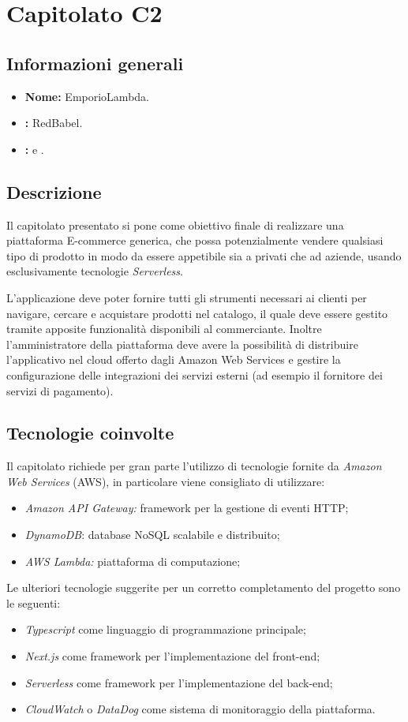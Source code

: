 \section{Capitolato C2}

\subsection{Informazioni generali}{
\begin{itemize}
\item \textbf{Nome:} EmporioLambda.
\item \textbf{\commitProg:} RedBabel.
\item \textbf{\proponProg:} \VT{} e \CR.
\end{itemize}
}

\subsection{Descrizione}{
Il capitolato presentato si pone come obiettivo finale di realizzare una piattaforma E-commerce generica, che possa potenzialmente vendere qualsiasi tipo di prodotto in modo da essere appetibile sia a privati che ad aziende, usando esclusivamente tecnologie \textit{Serverless}.

L'applicazione deve poter fornire tutti gli strumenti necessari ai clienti per navigare, cercare e acquistare prodotti nel catalogo, il quale deve essere gestito tramite apposite funzionalità disponibili al commerciante. Inoltre l'amministratore della piattaforma deve avere la possibilità di distribuire l'applicativo nel cloud offerto dagli Amazon Web Services e gestire la configurazione delle integrazioni dei servizi esterni (ad esempio il fornitore dei servizi di pagamento).
}

\subsection{Tecnologie coinvolte}{
Il capitolato richiede per gran parte l'utilizzo di tecnologie fornite da \textit{Amazon Web Services} (AWS), in particolare viene consigliato di utilizzare:
\begin{itemize}
\item \textit{Amazon API Gateway:} framework per la gestione di eventi HTTP;
\item \textit{DynamoDB}: database NoSQL scalabile e distribuito;
\item \textit{AWS Lambda:} piattaforma di computazione;
\end{itemize}
Le ulteriori tecnologie suggerite per un corretto completamento del progetto sono le seguenti:
\begin{itemize}
\item \textit{Typescript} come linguaggio di programmazione principale;
\item \textit{Next.js} come framework per l'implementazione del front-end;
\item \textit{Serverless} come framework per l'implementazione del back-end;
\item \textit{CloudWatch} o \textit{DataDog} come sistema di monitoraggio della piattaforma.
\end{itemize}
}

